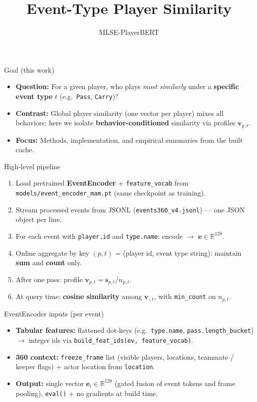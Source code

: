 \documentclass[aspectratio=169]{beamer}
\title{Event-Type Player Similarity}
\author{MLSE-PlayerBERT}
\date{}
\begin{document}
\begin{frame}
  \titlepage
\end{frame}

\begin{frame}{Goal (this work)}
  \begin{itemize}
    \item \textbf{Question:} For a given player, who plays \emph{most similarly} under a \textbf{specific event type} $t$ (e.g.\ \texttt{Pass}, \texttt{Carry})?
    \item \textbf{Contrast:} Global player similarity (one vector per player) mixes all behaviors; here we isolate \textbf{behavior-conditioned} similarity via profiles $\mathbf{v}_{p,t}$.
    \item \textbf{Focus:} Methods, implementation, and empirical summaries from the built cache.
  \end{itemize}
\end{frame}

\begin{frame}{High-level pipeline}
  \begin{enumerate}
    \item Load pretrained \textbf{EventEncoder} + \texttt{feature\_vocab} from \texttt{models/event\_encoder\_mam.pt} (same checkpoint as training).
    \item Stream processed events from JSONL (\texttt{events360\_v4.jsonl}) --- one JSON object per line.
    \item For each event with \texttt{player.id} and \texttt{type.name}: encode $\rightarrow$ $\mathbf{e} \in \mathbb{R}^{128}$.
    \item Online aggregate by key $(p,t)$ = (player id, event type string): maintain \textbf{sum} and \textbf{count} only.
    \item After one pass: profile $\mathbf{v}_{p,t} = \mathbf{s}_{p,t} / n_{p,t}$.
    \item At query time: \textbf{cosine similarity} among $\mathbf{v}_{\cdot,t}$, with \texttt{min\_count} on $n_{p,t}$.
  \end{enumerate}
\end{frame}

\begin{frame}{EventEncoder inputs (per event)}
  \begin{itemize}
    \item \textbf{Tabular features:} flattened dot-keys (e.g.\ \texttt{type.name}, \texttt{pass.length\_bucket}) $\rightarrow$ integer ids via \texttt{build\_feat\_ids(ev, feature\_vocab)}.
    \item \textbf{360 context:} \texttt{freeze\_frame} list (visible players, locations, teammate / keeper flags) + actor location from \texttt{location}.
    \item \textbf{Output:} single vector $\mathbf{e}_i \in \mathbb{R}^{128}$ (gated fusion of event tokens and frame pooling), \texttt{eval()} + no gradients at build time.
  \end{itemize}
\end{frame}
\end{document}
